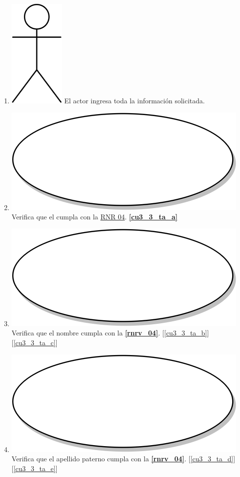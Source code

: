 \begin{enumerate}
\item {\includegraphics[scale=.1]{Capitulo3/img/actor.png} El actor ingresa toda la información solicitada.}
  \item {\includegraphics[scale=.05]{Capitulo3/img/proceso.png} Verifica que el cumpla con la \hyperref[rnr_04]{RNR 04}. \textbf{\ref{cu3_3_ta_a}}}
 \item {\includegraphics[scale=.05]{Capitulo3/img/proceso.png} Verifica que el nombre cumpla con la \textbf{\ref{rnrv_04}}. [\ref{cu3_3_ta_b}] [\ref{cu3_3_ta_c}]}
  \item {\includegraphics[scale=.05]{Capitulo3/img/proceso.png} Verifica que el apellido paterno cumpla con la \textbf{\ref{rnrv_04}}. [\ref{cu3_3_ta_d}] [\ref{cu3_3_ta_e}]}

\end{enumerate}
